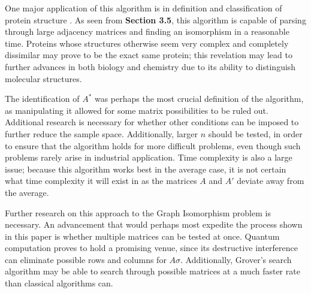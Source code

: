 \documentclass[12pt]{article}
\begin{document}
One major application of this algorithm is in definition and classification of protein structure\cite{2} . As seen from \textbf{Section 3.5}, this algorithm is capable of parsing through large adjacency matrices and finding an isomorphism in a reasonable time. Proteins whose structures otherwise seem very complex and completely dissimilar may prove to be the exact same protein; this revelation may lead to further advances in both biology and chemistry due to its ability to distinguish molecular structures.

The identification of $A^*$ was perhaps the most crucial definition of the algorithm, as manipulating it allowed for some matrix possibilities to be ruled out. Additional research is necessary for whether other conditions can be imposed to further reduce the sample space. Additionally, larger $n$ should be tested, in order to ensure that the algorithm holds for more difficult problems, even though such problems rarely arise in industrial application. Time complexity is also a large issue; because this algorithm works best in the average case, it is not certain what time complexity it will exist in as the matrices $A$ and $A'$ deviate away from the average.

Further research on this approach to the Graph Isomorphism problem is necessary. An advancement that would perhaps most expedite the process shown in this paper is whether multiple matrices can be tested at once. Quantum computation proves to hold a promising venue, since its destructive interference can eliminate possible rows and columns for $A\sigma$. Additionally, Grover's search algorithm\cite{8} may be able to search through possible matrices at a much faster rate than classical algorithms can. 

\clearpage
\appendix
\end{document}
